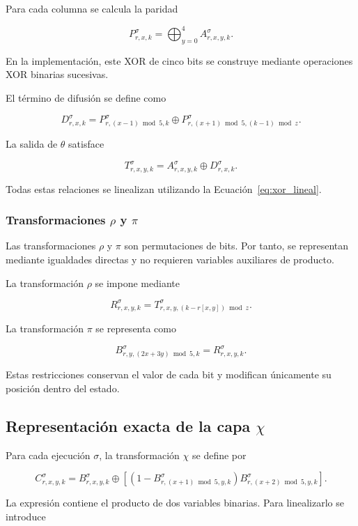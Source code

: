 Para cada columna se calcula la paridad

\[
P_{r,x,k}^{\sigma}
=
\bigoplus_{y=0}^{4}
A_{r,x,y,k}^{\sigma}.
\]

En la implementación, este XOR de cinco bits se construye mediante
operaciones XOR binarias sucesivas.

El término de difusión se define como

\[
D_{r,x,k}^{\sigma}
=
P_{r,(x-1)\bmod 5,k}^{\sigma}
\oplus
P_{r,(x+1)\bmod 5,(k-1)\bmod z}^{\sigma}.
\]

La salida de $\theta$ satisface

\[
T_{r,x,y,k}^{\sigma}
=
A_{r,x,y,k}^{\sigma}
\oplus
D_{r,x,k}^{\sigma}.
\]

Todas estas relaciones se linealizan utilizando la
Ecuación~\ref{eq:xor_lineal}.


\subsubsection{Transformaciones \texorpdfstring{$\rho$}{rho} y
\texorpdfstring{$\pi$}{pi}}

Las transformaciones $\rho$ y $\pi$ son permutaciones de bits. Por tanto,
se representan mediante igualdades directas y no requieren variables
auxiliares de producto.

La transformación $\rho$ se impone mediante

\[
R_{r,x,y,k}^{\sigma}
=
T_{r,x,y,(k-r[x,y])\bmod z}^{\sigma}.
\]

La transformación $\pi$ se representa como

\[
B_{r,y,(2x+3y)\bmod 5,k}^{\sigma}
=
R_{r,x,y,k}^{\sigma}.
\]

Estas restricciones conservan el valor de cada bit y modifican únicamente
su posición dentro del estado.


\subsection{Representación exacta de la capa \texorpdfstring{$\chi$}{chi}}
\label{subsec:chi_milp}

Para cada ejecución $\sigma$, la transformación $\chi$ se define por

\[
C_{r,x,y,k}^{\sigma}
=
B_{r,x,y,k}^{\sigma}
\oplus
\left[
\left(
1-B_{r,(x+1)\bmod 5,y,k}^{\sigma}
\right)
B_{r,(x+2)\bmod 5,y,k}^{\sigma}
\right].
\]

La expresión contiene el producto de dos variables binarias. Para
linealizarlo se introduce

